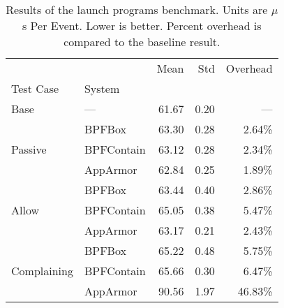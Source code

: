 \begin{table}[htp!]
\centering
\footnotesize
\caption[Results of the launch programs benchmark]{Results of the launch programs benchmark. Units are $\mu$s Per Event. Lower is better. Percent overhead is compared to the baseline result.}
\label{tab:phoronix-launch-programs}
\begin{tabular}{llrrr}
\toprule
            &          &   Mean &   Std & Overhead \\
Test Case & System &        &       &          \\
\midrule
Base & --- &  61.67 &  0.20 &      --- \\
\cline{1-5}
\multirow{3}{*}{Passive} & BPFBox &  63.30 &  0.28 &   2.64\% \\
            & BPFContain &  63.12 &  0.28 &   2.34\% \\
            & AppArmor &  62.84 &  0.25 &   1.89\% \\
\cline{1-5}
\multirow{3}{*}{Allow} & BPFBox &  63.44 &  0.40 &   2.86\% \\
            & BPFContain &  65.05 &  0.38 &   5.47\% \\
            & AppArmor &  63.17 &  0.21 &   2.43\% \\
\cline{1-5}
\multirow{3}{*}{Complaining} & BPFBox &  65.22 &  0.48 &   5.75\% \\
            & BPFContain &  65.66 &  0.30 &   6.47\% \\
            & AppArmor &  90.56 &  1.97 &  46.83\% \\
\bottomrule
\end{tabular}
\end{table}
